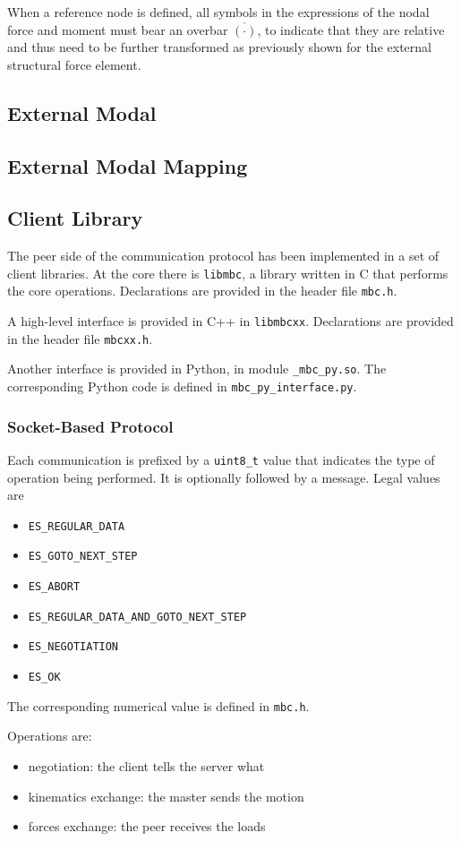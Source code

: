 When a reference node is defined, all symbols in the expressions
of the nodal force and moment must bear an overbar $\overline{(\cdot)}$,
to indicate that they are relative and thus need
to be further transformed as previously shown
for the external structural force element.

\subsection{External Modal}

\subsection{External Modal Mapping}

\subsection{Client Library}

The peer side of the communication protocol has been implemented
in a set of client libraries.
At the core there is \texttt{libmbc}, a library written in C
that performs the core operations.
Declarations are provided in the header file \texttt{mbc.h}.

A high-level interface is provided in C++ in \texttt{libmbcxx}.
Declarations are provided in the header file \texttt{mbcxx.h}.

Another interface is provided in Python, in module \texttt{\_mbc\_py.so}.
The corresponding Python code is defined in \texttt{mbc\_py\_interface.py}.

\subsubsection{Socket-Based Protocol}
Each communication is prefixed by a \texttt{uint8\_t} value
that indicates the type of operation being performed.
It is optionally followed by a message.
Legal values are
\begin{itemize}
\item \texttt{ES\_REGULAR\_DATA}
\item \texttt{ES\_GOTO\_NEXT\_STEP}
\item \texttt{ES\_ABORT}
\item \texttt{ES\_REGULAR\_DATA\_AND\_GOTO\_NEXT\_STEP}
\item \texttt{ES\_NEGOTIATION}
\item \texttt{ES\_OK}
\end{itemize}
The corresponding numerical value is defined in \texttt{mbc.h}.

Operations are:
\begin{itemize}
\item negotiation: the client tells the server what
\item kinematics exchange: the master sends the motion
\item forces exchange: the peer receives the loads
\end{itemize}

